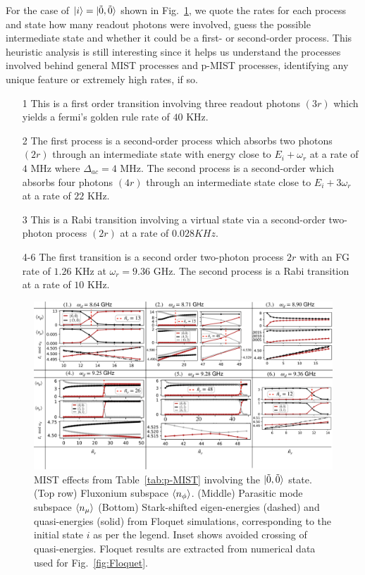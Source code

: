 \documentclass[prx,showpacs,notitlepage,twocolumn,superscriptaddress,nofootinbib,preprintnumbers,floatfix]{revtex4-2}
\begin{document}
For the case of $\ket{i}=\ket{\tilde{0},\tilde{0}}$ shown in Fig.~\ref{fig:Trans0}, we quote the rates for each process and state how many readout photons were involved, guess the possible intermediate state and whether it could be a first- or second-order process. This heuristic analysis is still interesting since it helps us understand the processes involved behind general MIST processes and p-MIST processes, identifying any unique feature or extremely high rates, if so. 
\begin{itemize}
    \item[1] This is a first order transition involving three readout photons $(3r)$ which yields a fermi's golden rule rate of $40$ KHz. 
    \item[2] The first process is a second-order process which absorbs two photons $(2r)$ through an intermediate state with energy close to $E_i+\omega_r$ at a rate of $4$ MHz where $\Delta_{ac}=4$ MHz. The second process is a second-order which absorbs four photons $(4r)$ through an intermediate state close to $E_i+3\omega_r$ at a rate of $22$ KHz. 
    \item[3] This is a Rabi transition involving a virtual state via a second-order two-photon process $(2r)$ at a rate of $0.028 KHz$. 
    \item[4-6] The first transition is a second order two-photon process $2r$ with an FG rate of $1.26$ KHz at $\omega_r=9.36$ GHz. The second process is a Rabi transition at a rate of $10$ KHz. 
\end{itemize} 
\begin{figure}
    \centering
    \includegraphics[width=1.0\textwidth]{Figures/Trans0.pdf}
    \caption{MIST effects from Table~\ref{tab:p-MIST} involving the $\ket{\tilde{0},\tilde{0}}$ state. (Top row) Fluxonium subspace $\braket{n_\phi}$. (Middle) Parasitic mode subspace $\braket{n_\mu}$ (Bottom) Stark-shifted eigen-energies (dashed) and quasi-energies (solid) from Floquet simulations, corresponding to the initial state $i$ as per the legend. Inset shows avoided crossing of quasi-energies. Floquet results are extracted from numerical data used for Fig.~\ref{fig:Floquet}.}
    \label{fig:Trans0}
\end{figure}
\end{document}
